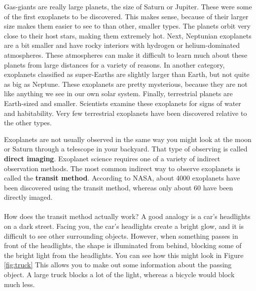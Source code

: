\documentclass[14pt]{article}
\begin{document}
\noindent Gas-giants are really large planets, the size of Saturn or Jupiter. These were some of the first exoplanets to be discovered. This makes sense, because of their larger size makes them easier to see to than other, smaller types. The planets orbit very close to their host stars, making them extremely hot. Next, Neptunian exoplanets are a bit smaller and have rocky interiors with hydrogen or helium-dominated atmospheres. These atmospheres can make it difficult to learn much about these planets from large distances for a variety of reasons. In another category, exoplanets classified as super-Earths are slightly larger than Earth, but not quite as big as Neptune. These exoplanets are pretty mysterious, because they are not like anything we see in our own solar system. Finally, terrestrial planets are Earth-sized and smaller. Scientists examine these exoplanets for signs of water and habitability. Very few terrestrial exoplanets have been discovered relative to the other types.

\newpage

\noindent Exoplanets are not usually observed in the same way you might look at the moon or Saturn through a telescope in your backyard. That type of observing is called \textbf{direct imaging}. Exoplanet science requires one of a variety of indirect observation methods. The most common indirect way to observe exoplanets is called the \textbf{transit method}. According to NASA, about 4000 exoplanets have been discovered using the transit method, whereas only about 60 have been directly imaged.
\\\\
\noindent How does the transit method actually work? A good analogy is a car's headlights on a dark street. Facing you, the car's headlights create a bright glow, and it is difficult to see other surrounding objects. However, when something passes in front of the headlights, the shape is illuminated from behind, blocking some of the bright light from the headlights. You can see how this might look in Figure \ref{fig:truck} This allows you to make out some information about the passing object. A large truck blocks a lot of the light, whereas a bicycle would block much less.
\end{document}
